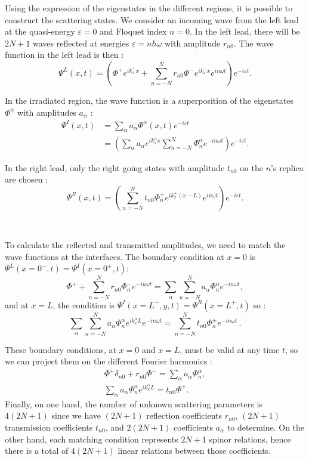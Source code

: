 \documentclass[aps,prb,showpacs,superscriptaddress,twocolumn,10pt,floatfix]{revtex4-1}
\newcommand{\ep}{\varepsilon}
\begin{document}
Using the expression of the eigenstates in the different regions, it is possible to construct the scattering states. We consider an incoming wave from the left lead at the quasi-energy $\ep=0$ and Floquet index $n=0$. In the left lead, there will be $2N+1$ waves reflected at energies $\ep=n\hbar\omega$ with amplitude $r_{n0}$. The wave function in the left lead is then :
\begin{equation}
\Psi^L(x,t)  =  \left( \Phi^+ e^{i k_x^+ x} + \sum_{n=-N}^{N}  r_{n0}  \Phi^-  e^{i k_x^- x} e^{i n \omega  t}  \right)  e^{- i \ep  t} .
\end{equation}

In the irradiated region, the wave function is a superposition of the eigenstates $\Phi^\alpha$ with amplitudes $a_\alpha$ :
\begin{align}
\Psi^I(x,t)  &= \sum_\alpha   a_{\alpha}  \Phi^{\alpha}(x,t) e^{- i \ep   t} \nonumber  \\
&= \left( \sum_{\alpha} a_{\alpha} e^{i k_x^{\alpha} x}  \sum_{n=-N}^{N}    \Phi^{\alpha}_n   e^{- i n \omega t} \right) e^{- i \ep   t}.
\end{align}

In the right lead, only the right going states with amplitude $t_{n0}$ on the $n$'s replica are chosen :
\begin{equation}
\Psi^R(x,t)  =  \left(\sum_{n=-N}^{N}  t_{n0}  \Phi_n^+  e^{i k_x^+(x-L)} e^{i n \omega  t}  \right) e^{- i \ep  t}. 
\end{equation}

\

To calculate the reflected and transmitted amplitudes, we need to match the wave functions at the interfaces. The boundary condition at $x=0$ is $\Psi^L(x=0^-,t)=\Psi^I(x=0^+,t)$: 
\begin{equation}
\Phi^+ + \sum_{n=-N}^{N}   r_{n0}  \Phi_n^- e^{- i n \omega  t}  =  \sum_{\alpha} \sum_{n=-N}^N   a_{\alpha}   \Phi^{\alpha}_n   e^{- i n \omega t}  , 
\end{equation}
and at $x=L$, the condition is $\Psi^I(x=L^-,y,t)=\Psi^R(x=L^+,t)$ so :
\begin{equation}
\sum_{\alpha} \sum_{n=-N}^N   a_{\alpha} \Phi^{\alpha}_n e^{i k_x^{\alpha} L} e^{-i n \omega t} = \sum_{n=-N}^{N}   t_{n0}  \Phi_n^+ e^{- i n \omega  t}  \,. 
\end{equation}

These boundary conditions, at $x=0$ and $x=L$, must be valid at any time $t$, so we can project them on the different Fourier harmonics :
\begin{eqnarray}
\Phi^+\delta_{n0}  +    r_{n0} \Phi^- =  \sum_{\alpha} a_{\alpha}   \Phi^{\alpha}_n    , \\
\sum_{\alpha} a_{\alpha}  \Phi^{\alpha}_n e^{i k_x^{\alpha} L} = t_{n0} \Phi^+  .
\end{eqnarray}
Finally, on one hand, the number of unknown scattering parameters is $4(2N+1)$ since we have $(2N+1)$ reflection coefficients $ r_{n0}$, $(2N+1)$ transmission coefficients $t_{n0}$, and $2(2N+1)$ coefficients $a_\alpha$ to determine. On the other hand, each matching condition represents $2N+1$ spinor relations, hence there is a total of $4(2N+1)$ linear relations between those coefficients. 
 
\end{document}
